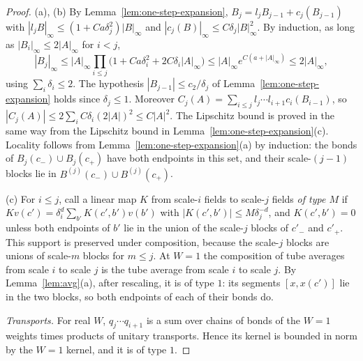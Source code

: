 \begin{proof}
(a), (b) By Lemma~\ref{lem:one-step-expansion}, $B_j=l_jB_{j-1}+c_j(B_{j-1})$ with $|l_jB|_\infty\le(1+Ca\delta_j^2)|B|_\infty$ and $|c_j(B)|_\infty\le C\delta_j|B|_\infty^2$. By induction, as long as $|B_{i}|_\infty\le2|A|_\infty$ for $i<j$,
\[
|B_j|_\infty\le|A|_\infty\prod_{i\le j}\big(1+Ca\delta_i^2+2C\delta_i|A|_\infty\big)\le|A|_\infty e^{C(a+|A|_\infty)}\le2|A|_\infty,
\]
using $\sum_i\delta_i\le2$. The hypothesis $|B_{j-1}|\le c_2/\delta_j$ of Lemma~\ref{lem:one-step-expansion} holds since $\delta_j\le1$. Moreover $C_j(A)=\sum_{i\le j}l_j\cdots l_{i+1}c_i(B_{i-1})$, so $|C_j(A)|\le2\sum_iC\delta_i(2|A|)^2\le C|A|^2$. The Lipschitz bound is proved in the same way from the Lipschitz bound in Lemma~\ref{lem:one-step-expansion}(c). Locality follows from Lemma~\ref{lem:one-step-expansion}(a) by induction: the bonds of $B_j(c_-)\cup B_j(c_+)$ have both endpoints in this set, and their scale-$(j-1)$ blocks lie in $B^{(j)}(c_-)\cup B^{(j)}(c_+)$.

(c) For $i\le j$, call a linear map $K$ from scale-$i$ fields to scale-$j$ fields \emph{of type $M$} if $Kv(c')=\delta_i^d\sum_{b'}K(c',b')v(b')$ with $|K(c',b')|\le M\delta_j^{-d}$, and $K(c',b')=0$ unless both endpoints of $b'$ lie in the union of the scale-$j$ blocks of $c'_-$ and $c'_+$. This support is preserved under composition, because the scale-$j$ blocks are unions of scale-$m$ blocks for $m\le j$. At $W=1$ the composition of tube averages from scale $i$ to scale $j$ is the tube average from scale $i$ to scale $j$. By Lemma~\ref{lem:avg}(a), after rescaling, it is of type $1$: its segments $[x,x(c')]$ lie in the two blocks, so both endpoints of each of their bonds do.

\emph{Transports.} For real $W$, $q_j\cdots q_{i+1}$ is a sum over chains of bonds of the $W=1$ weights times products of unitary transports. Hence its kernel is bounded in norm by the $W=1$ kernel, and it is of type $1$.


\end{proof}
